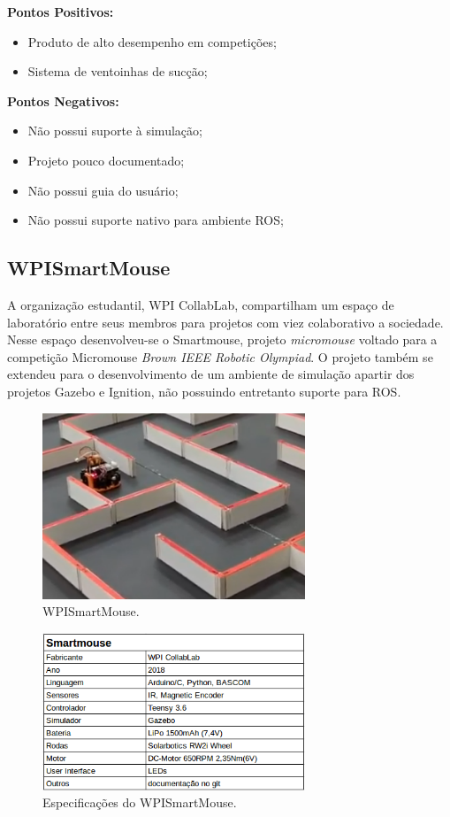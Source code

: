 \textbf{Pontos Positivos:}
\begin{itemize}
	\item Produto de alto desempenho em competições;
	\item Sistema de ventoinhas de sucção; 
\end{itemize}


\textbf{Pontos Negativos:}
\begin{itemize}
	\item Não possui suporte à simulação;
	\item Projeto pouco documentado;
	\item Não possui guia do usuário;
	\item Não possui suporte nativo para ambiente ROS;
\end{itemize}


\subsection{WPISmartMouse}
\hspace{0.5cm} A organização estudantil, WPI CollabLab, compartilham um espaço de laboratório entre seus membros para projetos com viez colaborativo a sociedade. Nesse espaço desenvolveu-se o Smartmouse, projeto \textit{micromouse} voltado para a competição Micromouse \textit{Brown IEEE Robotic  Olympiad}. O projeto também se extendeu para o desenvolvimento de um ambiente de simulação apartir dos projetos Gazebo e Ignition, não possuindo entretanto suporte para ROS.

\begin{figure}[H]
	\centering
	\includegraphics[width=0.7\textwidth]
	{Figures/WPISmartMouse_model.png}
	\caption{\label{fig:WPISmartMouse_model} WPISmartMouse. }
\end{figure}

\begin{figure}[H]
	\centering
	\includegraphics[width=0.7\textwidth]
	{Figures/WPISmartMouse.png}
	\caption{\label{fig:WPISmartMouse} Especificações do WPISmartMouse. }
\end{figure}


